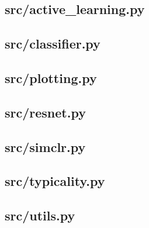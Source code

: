 \documentclass[10pt, conference, twocolumn]{IEEEtran}
\begin{document}






\clearpage
\subsection*{src/active\_learning.py}


\subsection*{src/classifier.py}


\subsection*{src/plotting.py}


\subsection*{src/resnet.py}


\subsection*{src/simclr.py}


\subsection*{src/typicality.py}


\subsection*{src/utils.py}

\end{document}
